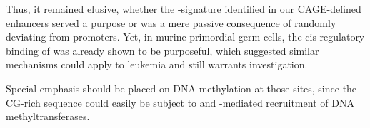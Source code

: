 Thus, it remained elusive, whether the -signature identified in our CAGE-defined enhancers served a purpose or was a mere passive consequence of   randomly deviating from promoters. Yet, in murine  primordial germ cells, the cis-regulatory binding of  was already shown to be purposeful\cite{Hu2017}, which suggested similar mechanisms could apply to \mllafnine leukemia and still warrants investigation.

Special emphasis should be placed on DNA methylation at those sites, since the CG-rich sequence could easily be subject to  and -mediated recruitment of DNA methyltransferases\cite{Vire2006}.


